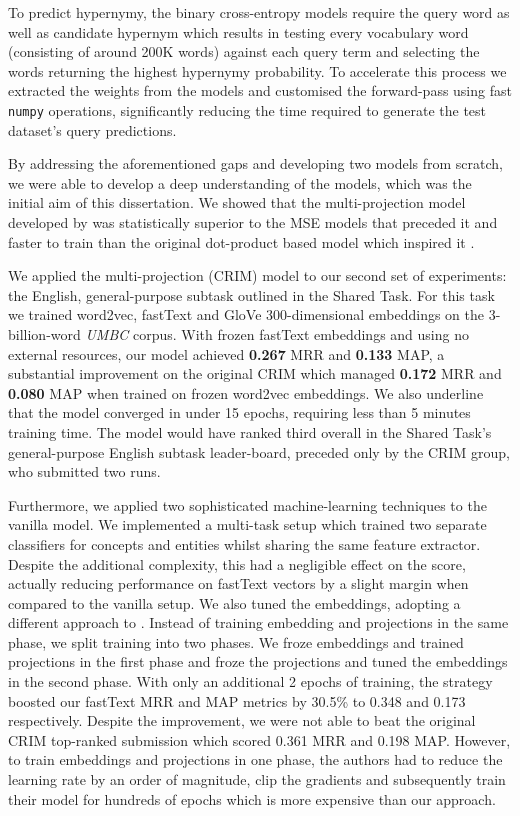 To predict hypernymy, the binary cross-entropy models require the query word as well as candidate hypernym which results in testing every vocabulary word (consisting of around 200K words) against each query term and selecting the words returning the highest hypernymy probability.  To accelerate this process we extracted the weights from the models and customised the forward-pass using fast \texttt{numpy} operations, significantly reducing the time required to generate the test dataset's query predictions.  

By addressing the aforementioned gaps and developing two models from scratch, we were able to develop a deep understanding of the models, which was the initial aim of this dissertation.  We showed that the multi-projection model developed by \citet{bernier2018crim} was statistically superior to the \ac{MSE} models that preceded it and faster to train than the original dot-product based model which inspired it \citep{yamane2016distributional}.  

We applied the multi-projection (CRIM) model to our second set of experiments: the English, general-purpose subtask outlined in the Shared Task.  For this task we trained word2vec, fastText and GloVe 300-dimensional embeddings on the 3-billion-word \textit{UMBC} corpus.  With frozen fastText embeddings and using no external resources, our model achieved \textbf{0.267} \ac{MRR} and \textbf{0.133} \ac{MAP}, a substantial improvement on the original CRIM which managed \textbf{0.172} \ac{MRR} and \textbf{0.080} \ac{MAP} when trained on frozen word2vec embeddings.  We also underline that the model converged in under 15 epochs, requiring less than 5 minutes training time.  The model would have ranked third overall in the Shared Task's general-purpose English subtask leader-board, preceded only by the \ac{CRIM} group, who submitted two runs.

Furthermore, we applied two sophisticated machine-learning techniques to the vanilla model.  We implemented a multi-task setup which trained two separate classifiers for concepts and entities whilst sharing the same feature extractor.  Despite the additional complexity, this had a negligible effect on the score, actually reducing performance on fastText vectors by a slight margin when compared to the vanilla setup.  We also tuned the embeddings, adopting a different approach to \citeauthor{bernier2018crim}.  Instead of training embedding and projections in the same phase, we split training into two phases.  We froze embeddings and trained projections in the first phase and froze the projections and tuned the embeddings in the second phase.  With only an additional 2 epochs of training, the strategy boosted our fastText \ac{MRR} and \ac{MAP} metrics by 30.5\% to 0.348 and 0.173 respectively.  Despite the improvement, we were not able to beat the original CRIM top-ranked submission which scored 0.361 \ac{MRR} and 0.198 \ac{MAP}.  However, to train embeddings and projections in one phase, the authors had to reduce the learning rate by an order of magnitude, clip the gradients and subsequently train their model for hundreds of epochs which is more expensive than our approach.


